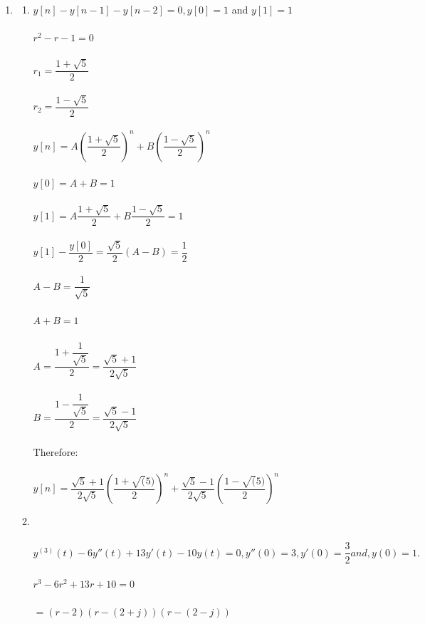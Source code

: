 \documentclass[10pt,a4paper, margin=1in]{article}
\begin{document}
\begin{enumerate}
\item %
    \begin{enumerate}   
        \item %
        $y[n] - y[n-1] - y[n-2] = 0, y[0]=1$ and $y[1]=1$
        \\\\ $r^2 - r -1 = 0$
        \\\\ $r_{1} = \dfrac{1+\sqrt5}{2}$
        \\\\ $r_{2} = \dfrac{1-\sqrt5}{2} $
        \\\\ $y[n] = A (\dfrac{1+\sqrt5}{2})^n + B(\dfrac{1-\sqrt5}{2})^n $
        \\\\ $y[0] = A + B = 1$
        \\\\ $y[1] = A \dfrac{1+\sqrt5}{2} + B\dfrac{1-\sqrt5}{2} = 1$
        \\\\ $y[1] - \dfrac{y[0]}{2} = \dfrac{\sqrt{5}}{2}(A-B) = \dfrac{1}{2} $
        \\\\ $A-B = \dfrac{1}{\sqrt{5}}$
        \\\\ $A+B = 1$
        \\\\ $A = \dfrac{1+\dfrac{1}{\sqrt{5}}}{2} = \dfrac{\sqrt{5}+1}{2\sqrt{5}}$
        \\\\ $B = \dfrac{1-\dfrac{1}{\sqrt{5}}}{2} = \dfrac{\sqrt{5}-1}{2\sqrt{5}}$
        \\\\ Therefore: 
        \\\\ $y[n] =  \dfrac{\sqrt{5}+1}{2\sqrt{5}} (\dfrac{1+\sqrt(5)}{2})^n +  \dfrac{\sqrt{5}-1}{2\sqrt{5}}(\dfrac{1-\sqrt(5)}{2})^n$
        \\
        \item %
        \\\\$y^(3)(t) - 6y''(t) + 13y'(t) - 10y(t) = 0, y''(0) =3, y'(0) =\dfrac{3}{2} and, y(0) = 1.$
        \\\\$r^3 - 6r^2 +13r+ 10 = 0$
        \\\\$ = (r-2) (r - (2+j))(r - (2-j))$

\end{enumerate}
\end{enumerate}
\end{document}
